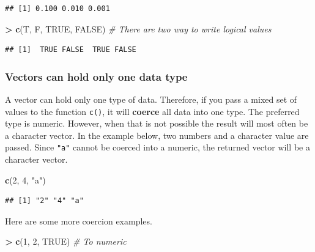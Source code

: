 \documentclass[]{book}
\newenvironment{Shaded}{\begin{snugshade}}{\end{snugshade}}
\newcommand{\CommentTok}[1]{\textcolor[rgb]{0.56,0.35,0.01}{\textit{#1}}}
\newcommand{\DecValTok}[1]{\textcolor[rgb]{0.00,0.00,0.81}{#1}}
\newcommand{\KeywordTok}[1]{\textcolor[rgb]{0.13,0.29,0.53}{\textbf{#1}}}
\newcommand{\NormalTok}[1]{#1}
\newcommand{\OperatorTok}[1]{\textcolor[rgb]{0.81,0.36,0.00}{\textbf{#1}}}
\newcommand{\OtherTok}[1]{\textcolor[rgb]{0.56,0.35,0.01}{#1}}
\newcommand{\StringTok}[1]{\textcolor[rgb]{0.31,0.60,0.02}{#1}}
\begin{document}
\begin{verbatim}
## [1] 0.100 0.010 0.001
\end{verbatim}

\begin{Shaded}
\begin{Highlighting}[]
\OperatorTok{>}\StringTok{ }\KeywordTok{c}\NormalTok{(T, F, }\OtherTok{TRUE}\NormalTok{, }\OtherTok{FALSE}\NormalTok{) }\CommentTok{# There are two way to write logical values}
\end{Highlighting}
\end{Shaded}

\begin{verbatim}
## [1]  TRUE FALSE  TRUE FALSE
\end{verbatim}

\hypertarget{vectors-can-hold-only-one-data-type}{%
\subsubsection*{Vectors can hold only one data type}\label{vectors-can-hold-only-one-data-type}}

A vector can hold only one type of data. Therefore, if you pass a mixed set of values to the function \texttt{c()}, it will \textbf{coerce} all data into one type. The preferred type is numeric. However, when that is not possible the result will most often be a character vector. In the example below, two numbers and a character value are passed. Since \texttt{"a"} cannot be coerced into a numeric, the returned vector will be a character vector.

\begin{Shaded}
\begin{Highlighting}[]
\KeywordTok{c}\NormalTok{(}\DecValTok{2}\NormalTok{, }\DecValTok{4}\NormalTok{, }\StringTok{"a"}\NormalTok{) }
\end{Highlighting}
\end{Shaded}

\begin{verbatim}
## [1] "2" "4" "a"
\end{verbatim}

Here are some more coercion examples.

\begin{Shaded}
\begin{Highlighting}[]
\OperatorTok{>}\StringTok{ }\KeywordTok{c}\NormalTok{(}\DecValTok{1}\NormalTok{, }\DecValTok{2}\NormalTok{, }\OtherTok{TRUE}\NormalTok{) }\CommentTok{# To numeric}
\end{Highlighting}
\end{Shaded}
\end{document}
